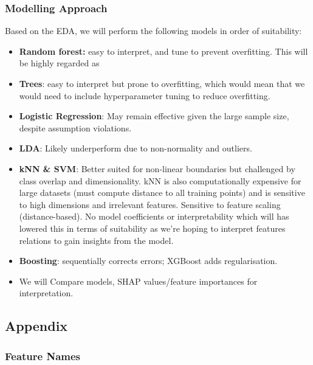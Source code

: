 \documentclass[
  letterpaper,
  DIV=11,
  numbers=noendperiod]{scrartcl}
\providecommand{\tightlist}{%
  \setlength{\itemsep}{0pt}\setlength{\parskip}{0pt}}\usepackage{longtable,booktabs,array}
\begin{document}
\subsubsection{Modelling Approach}\label{modelling-approach}

Based on the EDA, we will perform the following models in order of
suitability:

\begin{itemize}
\tightlist
\item
  \textbf{Random forest:} easy to interpret, and tune to prevent
  overfitting. This will be highly regarded as
\item
  \textbf{Trees}: easy to interpret but prone to overfitting, which
  would mean that we would need to include hyperparameter tuning to
  reduce overfitting.
\item
  \textbf{Logistic Regression}: May remain effective given the large
  sample size, despite assumption violations.
\item
  \textbf{LDA}: Likely underperform due to non-normality and outliers.
\item
  \textbf{kNN \& SVM}: Better suited for non-linear boundaries but
  challenged by class overlap and dimensionality. kNN is also
  computationally expensive for large datasets (must compute distance to
  all training points) and is sensitive to high dimensions and
  irrelevant features. Sensitive to feature scaling (distance-based). No
  model coefficients or interpretability which will has lowered this in
  terms of suitability as we're hoping to interpret features relations
  to gain insights from the model.
\item
  \textbf{Boosting}: sequentially corrects errors; XGBoost adds
  regularisation.
\item
  We will Compare models, SHAP values/feature importances for
  interpretation.
\end{itemize}

\subsection{Appendix}\label{appendix}

\subsubsection{Feature Names}\label{feature-names}
\end{document}
